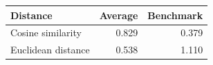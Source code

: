 \begin{tabular}[t]{lrr}
\toprule
Distance & Average & Benchmark \\
\midrule 
Cosine similarity & 0.829 & 0.379 \\
Euclidean distance & 0.538 & 1.110 \\
\bottomrule
\end{tabular}